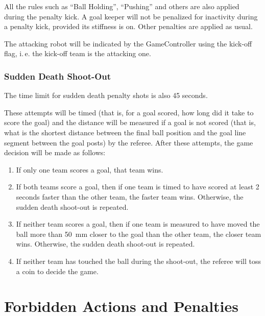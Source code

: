 \documentclass[12pt]{article}
\newcommand{\ie}{\mbox{i.\,e.}\xspace}
\begin{document}
All the rules such as ``Ball Holding'', ``Pushing'' and others are also applied during the penalty kick.  A goal keeper will not be penalized for inactivity during a penalty kick, provided its stiffness is on. Other penalties are applied as usual.

The attacking robot will be indicated by the GameController using the kick-off flag, \ie the kick-off team is the attacking one.

\subsubsection{Sudden Death Shoot-Out}
\label{sec:sudden_death_shoot_out}

The time limit for sudden death penalty shots is also 45 seconds.

These attempts will be timed (that is, for a goal scored, how long did it take to score the goal) and the distance will be measured if a goal is not scored (that is, what is the shortest distance between the final ball position and the goal line segment between the goal posts) by the referee. After these attempts, the game decision will be made as follows:

\begin{enumerate}

\item If only one team scores a goal, that team wins.

\item If both teams score a goal, then if one team is timed to have scored at least 2 seconds faster than the other team, the faster team wins. Otherwise, the sudden death shoot-out is repeated.

\item If neither team scores a goal, then if one team is measured to have moved the ball more than 50~mm closer to the goal than the other team, the closer team wins. Otherwise, the sudden death shoot-out is repeated.

\item If neither team has touched the ball during the shoot-out, the referee will toss a coin to decide the game.

\end{enumerate}


\newpage


\section{Forbidden Actions and Penalties}
\label{sec:forbidden_act}
\end{document}

